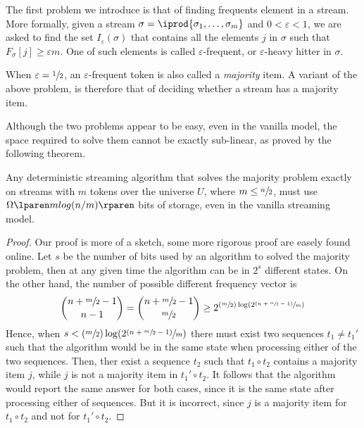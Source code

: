 \documentclass{subfiles}
\begin{document}
    The first problem we introduce is that of finding frequents element in a stream.
        More formally, given a stream \(\sigma = \iprod{\sigma_{1}, \ldots, \sigma_{m}}\) and \(0 < \varepsilon < 1\), 
        we are asked to find the set \(I_{\varepsilon}(\sigma)\) that contains all 
        the elements \(j\) in \(\sigma\) such that \(F_{\sigma}[j] \ge \varepsilon m\).
        One of such elements is called \(\varepsilon\)-frequent, or \(\varepsilon\)-heavy hitter in \(\sigma\).

    When \(\varepsilon = \sfrac{1}{2}\), an \(\varepsilon\)-frequent token is also called a \emph{majority} item.
        A variant of the above problem, is therefore that of deciding whether a stream has 
        a majority item.

    Although the two problems appear to be easy, even in the vanilla model,
        the space required to solve them cannot be exactly sub-linear, 
        as proved by the following theorem.

    \begin{theorem*}
        Any deterministic streaming algorithm that solves the majority problem exactly on
        streams with \(m\) tokens over the universe \(U\), where \(m \le \sfrac{n}{2}\),
        must use \(\ofW{m log(n/m)}\) bits of storage, even in the vanilla streaming model.
    \end{theorem*}
    \begin{proof}
        Our proof is more of a sketch, some more rigorous proof are easely found online. 
        Let \(s\) be the number of bits used by an algorithm to solved the majority problem,
        then at any given time the algorithm can be in \(2^{s}\) different states.
        On the other hand, the number of possible different frequency vector is 
        \[
            \binom{n + \sfrac{m}{2} - 1}{n -1} =
            \binom{n + \sfrac{m}{2} - 1}{\sfrac{m}{2}} 
            \ge 2^{(\sfrac{m}{2})\log(2\sfrac{(n + \sfrac{m}{2} - 1)}{m}) }
        \]
        Hence, when \(s < (\sfrac{m}{2})\log(2\sfrac{(n + \sfrac{m}{2} - 1)}{m}) \) 
        there must exist two sequences \(t_{1} \ne t_{1}'\) such that the algorithm would 
        be in the same state when processing either of the two sequences.
        Then, ther exist a sequence \(t_{2}\) such that \(t_{1} \circ t_{2}\)
        contains a majority item \(j\), while \(j\) is not a majority item in \(t_{1}' \circ t_{2}\).
        It follows that the algorithm would report the same answer for both cases, 
        since it is the same state after processing either of sequences.
        But it is incorrect, since \(j\) is a majority item for \(t_{1} \circ t_{2}\)
        and not for \(t_{1}' \circ t_{2}\).
    \end{proof}
\end{document}
